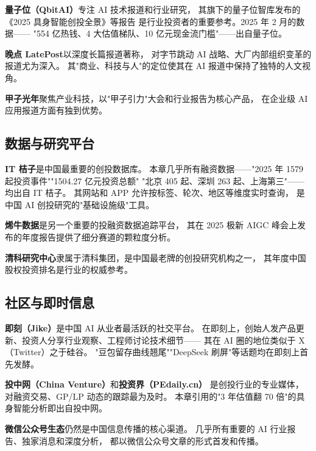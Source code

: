 \textbf{量子位（QbitAI）}专注 AI 技术报道和行业研究，
其旗下的量子位智库发布的《2025 具身智能创投全景》等报告
是行业投资者的重要参考。2025 年 2 月的数据——
"554 亿热钱、4 大估值梯队、10 亿元现金流门槛"——出自量子位。

\textbf{晚点 LatePost}以深度长篇报道著称，
对字节跳动 AI 战略、大厂内部组织变革的报道尤为深入。
其"商业、科技与人"的定位使其在 AI 报道中保持了独特的人文视角。

\textbf{甲子光年}聚焦产业科技，以"甲子引力"大会和行业报告为核心产品，
在企业级 AI 应用报道方面有独到优势。

\subsection{数据与研究平台}
\label{subsec:china-data-platforms}

\textbf{IT 桔子}是中国最重要的创投数据库。
本章几乎所有融资数据——"2025 年 1579 起投资事件""1504.27 亿元投资总额"
"北京 405 起、深圳 263 起、上海第三"——均出自 IT 桔子。
其网站和 APP 允许按标签、轮次、地区等维度实时查询，
是中国 AI 创投研究的"基础设施级"工具。

\textbf{烯牛数据}是另一个重要的投融资数据追踪平台，
其在 2025 极新 AIGC 峰会上发布的年度报告提供了细分赛道的颗粒度分析。

\textbf{清科研究中心}隶属于清科集团，是中国最老牌的创投研究机构之一，
其年度中国股权投资排名是行业的权威参考。

\subsection{社区与即时信息}
\label{subsec:china-communities}

\textbf{即刻（Jike）}是中国 AI 从业者最活跃的社交平台。
在即刻上，创始人发产品更新、投资人分享行业观察、工程师讨论技术细节——
其在 AI 圈的地位类似于 X（Twitter）之于硅谷。
"豆包留存曲线翘尾""DeepSeek 刷屏"等话题均在即刻上首先发酵。

\textbf{投中网（China Venture）}和\textbf{投资界（PEdaily.cn）}
是创投行业的专业媒体，对融资交易、GP/LP 动态的跟踪最为及时。
本章引用的"3 年估值翻 70 倍"的具身智能分析即出自投中网。

\textbf{微信公众号生态}仍然是中国信息传播的核心渠道。
几乎所有重要的 AI 行业报告、独家消息和深度分析，
都以微信公众号文章的形式首发和传播。




